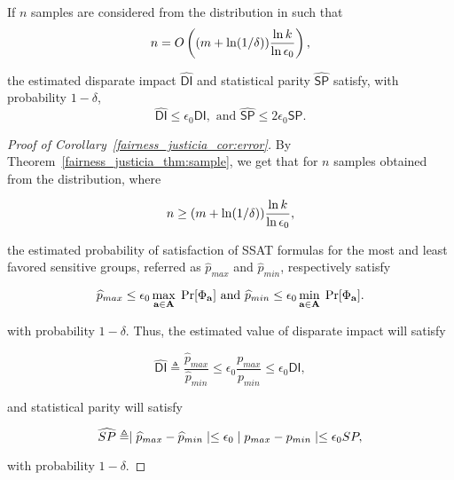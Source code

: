 \begin{corollary}
	\label{fairness_justicia_cor:error}
	If $n$ samples are considered from the  distribution in {\justicia} such that 
	\[
	n = O\left((m + \ln(1/\delta))\frac{\ln k}{\ln \epsilon_0}\right),
	\]
	
	the estimated disparate impact    $\widehat{\mathsf{DI}}$ and statistical parity  $\widehat{\mathsf{SP}}$ satisfy, with probability $1-\delta$,
	\[
	\widehat{\mathsf{DI}} \leq  \epsilon_0 \mathsf{DI},\text{ and }  \widehat{\mathsf{SP}} \leq 2\epsilon_0 \mathsf{SP}.
	\]
\end{corollary}


\begin{proof}[Proof of Corollary~\ref{fairness_justicia_cor:error}] 
By Theorem~\ref{fairness_justicia_thm:sample}, we get that for $n$ samples obtained from the distribution, where

$$ n \geq (m + \ln(1/\delta))\frac{\ln k}{\ln \epsilon_0},$$

the estimated probability of satisfaction of SSAT formulas for the most and least favored sensitive groups, referred as $\widehat{p}_{max}$ and  $\widehat{p}_{min}$, respectively satisfy

\begin{equation}
\widehat{p}_{max} \leq \epsilon_0 \max_{\mathbf{a} \in \mathbf{A}} \; \Pr[\Phi_{\mathbf{a}}]
\text{ and }
\widehat{p}_{min} \leq \epsilon_0 \min_{\mathbf{a} \in \mathbf{A}} \; \Pr[\Phi_{\mathbf{a}}].\notag
\end{equation}

with probability $ 1-\delta $.
Thus, the estimated value of disparate impact will satisfy

$$\widehat{\mathsf{DI}} \triangleq \frac{\widehat{p}_{max}}{\widehat{p}_{min}} \leq \epsilon_0  \frac{p_{max}}{p_{min}} \leq \epsilon_0 \mathsf{DI},$$

and statistical parity will satisfy 

$$\widehat{SP} \triangleq \mid \widehat{p}_{max} - \widehat{p}_{min} \mid \leq  \epsilon_0  \mid p_{max} - p_{min} \mid \leq \epsilon_0 SP,$$

with probability $1-\delta$.
\end{proof}







